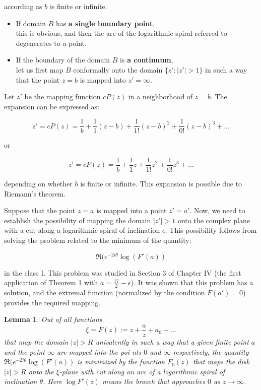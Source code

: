 \documentclass[
]{book}
\newtheorem{lemma}{Lemma}[chapter]
\theoremstyle{definition}
\theoremstyle{definition}
\theoremstyle{definition}
\theoremstyle{definition}
\theoremstyle{remark}
\begin{document}
according as \(b\) is finite or infinite.

\begin{itemize}
\item
  If domain \(B\) has \textbf{a single boundary point},\\
  this is obvious, and then the arc of the logarithmic spiral referred to degenerates to a point.
\item
  If the boundary of the domain \(B\) is \textbf{a continuum},\\
  let us first map \(B\) conformally onto the domain \(\{z' : |z'| > 1\}\) in such a way that the point \(z = b\) is mapped into \(z' = \infty\).
\end{itemize}

Let \(z'\) be the mapping function \(cP(z)\) in a neighborhood of \(z = b\). The expansion can be expressed as:

\[
z' = cP(z) = \frac{1}{b} + \frac{1}{1} (z - b) + \frac{1}{1!} (z - b)^2 + \frac{1}{0!} (z - b)^3 + \ldots
\]

or

\[
z' = cP(z) = \frac{1}{b} + \frac{1}{1}z + \frac{1}{1!}z^2 + \frac{1}{0!}z^3 + \ldots
\]

depending on whether \(b\) is finite or infinite. This expansion is possible due to Riemann's theorem.

Suppose that the point \(z = a\) is mapped into a point \(z' = a'\). Now, we need to establish the possibility of mapping the domain \(\lvert z' \rvert > 1\) onto the complex plane with a cut along a logarithmic spiral of inclination \(\epsilon\). This possibility follows from solving the problem related to the minimum of the quantity:

\[
 \Re(e^{-2i\theta} \log (F'(a))
\]

in the class I. This problem was studied in Section 3 of Chapter IV (the first application of Theorem 1 with \(a = \frac{17}{2} - \epsilon\)). It was shown that this problem has a solution, and the extremal function (normalized by the condition \(F(a') = 0\)) provides the required mapping.

\begin{lemma}
\protect\hypertarget{lem:unnamed-chunk-70}{}\label{lem:unnamed-chunk-70}Out of all functions
\[
\xi=F(z) := z + \frac{a}{z} + a_0 + \ldots
\]
that map the domain \(|z| > R\) univalently in such a way that a given finite point \(a\) and the point \(\infty\) are
mapped into the poi nts \(0\) and \(\infty\) respectively, the quantity \(\Re(e^{-2i\theta} \log (F'(a))\)
is minimized by the function \(F_0(z)\) that maps the disk \(|z| > R\) onto the \(\xi\)-plane with cut along an arc of a logarithmic spiral of inclination \(\theta\). Here \(\log F '(z)\) means the brooch that approaches \(0\) as \(z \to \infty\).
\end{lemma}
\end{document}
